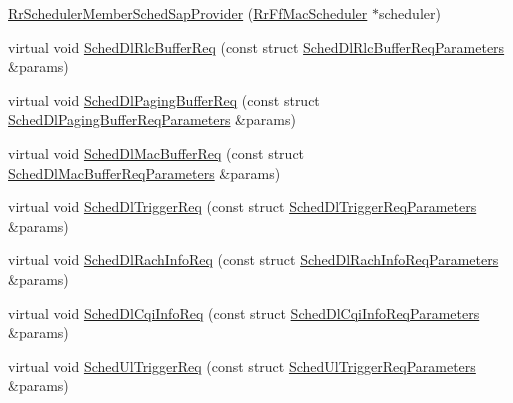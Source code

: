 \begin{DoxyCompactItemize}
\item 
\hyperlink{classns3_1_1RrSchedulerMemberSchedSapProvider_a3077e2378535150998298f8e20be0cee}{Rr\+Scheduler\+Member\+Sched\+Sap\+Provider} (\hyperlink{classns3_1_1RrFfMacScheduler}{Rr\+Ff\+Mac\+Scheduler} $\ast$scheduler)
\item 
virtual void \hyperlink{classns3_1_1RrSchedulerMemberSchedSapProvider_aa7551918e93e4897abc3e026748a75d2}{Sched\+Dl\+Rlc\+Buffer\+Req} (const struct \hyperlink{structns3_1_1FfMacSchedSapProvider_1_1SchedDlRlcBufferReqParameters}{Sched\+Dl\+Rlc\+Buffer\+Req\+Parameters} \&params)
\item 
virtual void \hyperlink{classns3_1_1RrSchedulerMemberSchedSapProvider_acf12e06da122ad6fd90db0f4bf375620}{Sched\+Dl\+Paging\+Buffer\+Req} (const struct \hyperlink{structns3_1_1FfMacSchedSapProvider_1_1SchedDlPagingBufferReqParameters}{Sched\+Dl\+Paging\+Buffer\+Req\+Parameters} \&params)
\item 
virtual void \hyperlink{classns3_1_1RrSchedulerMemberSchedSapProvider_a8864c01914a55539a05816cc8309094f}{Sched\+Dl\+Mac\+Buffer\+Req} (const struct \hyperlink{structns3_1_1FfMacSchedSapProvider_1_1SchedDlMacBufferReqParameters}{Sched\+Dl\+Mac\+Buffer\+Req\+Parameters} \&params)
\item 
virtual void \hyperlink{classns3_1_1RrSchedulerMemberSchedSapProvider_a36e60d5983fb4836fe35094d824a2eed}{Sched\+Dl\+Trigger\+Req} (const struct \hyperlink{structns3_1_1FfMacSchedSapProvider_1_1SchedDlTriggerReqParameters}{Sched\+Dl\+Trigger\+Req\+Parameters} \&params)
\item 
virtual void \hyperlink{classns3_1_1RrSchedulerMemberSchedSapProvider_a2f21daecbc043997c4188d24451b6819}{Sched\+Dl\+Rach\+Info\+Req} (const struct \hyperlink{structns3_1_1FfMacSchedSapProvider_1_1SchedDlRachInfoReqParameters}{Sched\+Dl\+Rach\+Info\+Req\+Parameters} \&params)
\item 
virtual void \hyperlink{classns3_1_1RrSchedulerMemberSchedSapProvider_a5f9fe5598b2f80e106eaba32978af868}{Sched\+Dl\+Cqi\+Info\+Req} (const struct \hyperlink{structns3_1_1FfMacSchedSapProvider_1_1SchedDlCqiInfoReqParameters}{Sched\+Dl\+Cqi\+Info\+Req\+Parameters} \&params)
\item 
virtual void \hyperlink{classns3_1_1RrSchedulerMemberSchedSapProvider_ac54a2ce144bbf33b0d6eee4669f91fcc}{Sched\+Ul\+Trigger\+Req} (const struct \hyperlink{structns3_1_1FfMacSchedSapProvider_1_1SchedUlTriggerReqParameters}{Sched\+Ul\+Trigger\+Req\+Parameters} \&params)
\item 

\end{DoxyCompactItemize}
